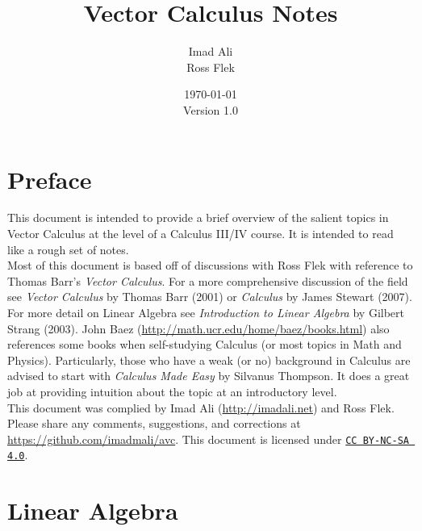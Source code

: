 \documentclass[12pt]{article}
\title{\textbf{Vector Calculus Notes}}
\author{Imad Ali \\
Ross Flek}
\date{\today \\
\bigskip
Version 1.0
}
\begin{document}

\def\ci{\perp\!\!\!\perp}
\def\ex{\mathbb{E}}
\def\prob{\mathbb{P}}
\def\ind{\mathbb{I}}
\def\grad{\triangledown}
\def\bigo{\mathcal{O}}

\def\real{\mathbb{R}}
\def\p#1#2{\frac{\partial #1}{\partial #2}}
\def\norm#1{\parallel#1\parallel}

\maketitle

\tableofcontents

\pagebreak

\section*{Preface}

This document is intended to provide a brief overview of the salient topics in Vector Calculus at the level of a Calculus III/IV course. It is intended to read like a rough set of notes. \\

Most of this document is based off of discussions with Ross Flek with reference to Thomas Barr's \emph{Vector Calculus}. For a more comprehensive discussion of the field see \emph{Vector Calculus} by Thomas Barr (2001) or \emph{Calculus} by James Stewart (2007). For more detail on Linear Algebra see \emph{Introduction to Linear Algebra} by Gilbert Strang (2003). John Baez (\url{http://math.ucr.edu/home/baez/books.html}) also references some books when self-studying Calculus (or most topics in Math and Physics). Particularly, those who have a weak (or no) background in Calculus are advised to start with \emph{Calculus Made Easy} by Silvanus Thompson. It does a great job at providing intuition about the topic at an introductory level. \\ 

This document was complied by Imad Ali (\url{http://imadali.net}) and Ross Flek. Please share any comments, suggestions, and corrections at \url{https://github.com/imadmali/avc}. This document is licensed under \href{https://creativecommons.org/licenses/by-nc-sa/4.0/}{\tt CC BY-NC-SA 4.0}.
 
\pagebreak
 
\section{Linear Algebra}
\end{document}
